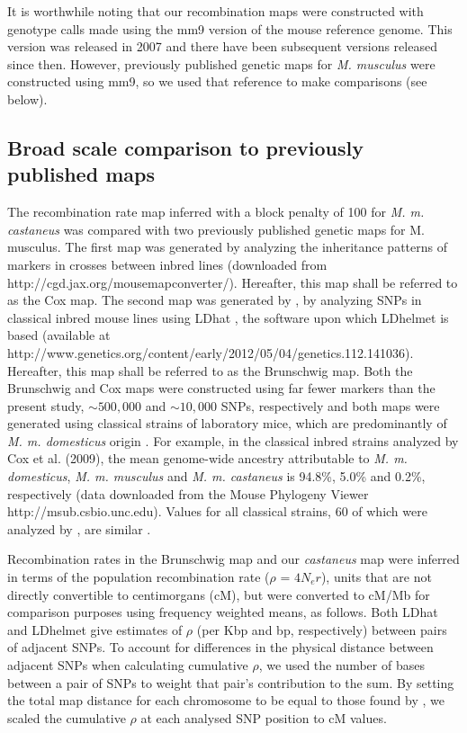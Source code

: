 It is worthwhile noting that our recombination maps were constructed with genotype calls made using the mm9 version of the mouse reference genome. This version was released in 2007 and there have been subsequent versions released since then. However, previously published genetic maps for \textit{M. musculus} were constructed using mm9, so we used that reference to make comparisons (see below).
 
\subsection{Broad scale comparison to previously published maps}
 
The recombination rate map inferred with a block penalty of 100 for \emph{M. m. castaneus} was compared with two previously published genetic maps for M. musculus. The first map was generated by analyzing the inheritance patterns of markers in crosses between inbred lines \citep{RN232} (downloaded from http://cgd.jax.org/mousemapconverter/). Hereafter, this map shall be referred to as the Cox map. The second map was generated by \cite{RN156}, by analyzing SNPs in classical inbred mouse lines using LDhat \citep{RN260}, the software upon which LDhelmet is based (available at http://www.genetics.org/content/early/2012/05/04/genetics.112.141036). Hereafter, this map shall be referred to as the Brunschwig map. Both the Brunschwig and Cox maps were constructed using far fewer markers than the present study, $\sim500,000$ and $\sim10,000$ SNPs, respectively and both maps were generated using classical strains of laboratory mice, which are predominantly of \emph{M. m. domesticus} origin \citep{RN243}. For example, in the classical inbred strains analyzed by Cox et al. (2009), the mean genome-wide ancestry attributable to \emph{M. m. domesticus}, \emph{M. m. musculus} and \emph{M. m. castaneus} is 94.8\%, 5.0\% and 0.2\%, respectively (data downloaded from the Mouse Phylogeny Viewer \citep{RN280} http://msub.csbio.unc.edu). Values for all classical strains, 60 of which were analyzed by \cite{RN156}, are similar \citep{RN243}.

Recombination rates in the Brunschwig map and our \textit{castaneus} map were inferred in terms of the population recombination rate ($\rho$ = $4N_er$), units that are not directly convertible to centimorgans (cM), but were converted to cM/Mb for comparison purposes using frequency weighted means, as follows. Both LDhat and LDhelmet give estimates of $\rho$ (per Kbp and bp, respectively) between pairs of adjacent SNPs. To account for differences in the physical distance between adjacent SNPs when calculating cumulative $\rho$, we used the number of bases between a pair of SNPs to weight that pair’s contribution to the sum. By setting the total map distance for each chromosome to be equal to those found by \cite{RN232}, we scaled the cumulative $\rho$ at each analysed SNP position to cM values.
 

